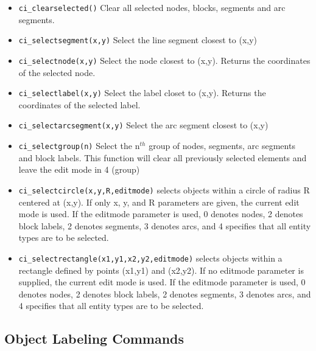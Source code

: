 \begin{itemize}
\item {\tt ci\_clearselected()} Clear all selected nodes, blocks, segments and arc
segments.

\item {\tt ci\_selectsegment(x,y)} Select the line segment closest to (x,y)

\item {\tt ci\_selectnode(x,y)} Select the node closest to (x,y).
Returns the coordinates of the selected node.

\item {\tt ci\_selectlabel(x,y)} Select the label closet to (x,y).
Returns the coordinates of the selected label.

\item {\tt ci\_selectarcsegment(x,y)} Select the arc segment closest to (x,y)

\item {\tt ci\_selectgroup(n)} Select the n$^{th}$ group of nodes, segments, arc
segments and block labels. This function will clear all previously selected
elements and leave the edit mode in 4 (group)

\item{\tt ci\_selectcircle(x,y,R,editmode)} selects objects within a circle of radius
R centered at (x,y).  If only x, y, and R parameters are given, the current
edit mode is used.  If the editmode parameter is used, 0 denotes nodes, 2
denotes block labels, 2 denotes segments, 3 denotes arcs, and 4 specifies
that all entity types are to be selected.

\item{\tt ci\_selectrectangle(x1,y1,x2,y2,editmode)} selects objects within a rectangle
defined by points (x1,y1) and (x2,y2). If no editmode parameter is supplied,
the current edit mode is used.  If the editmode parameter is used, 0 denotes
nodes, 2 denotes block labels, 2 denotes segments, 3 denotes arcs, and 4
specifies that all entity types are to be selected.

\end{itemize}


\subsection{Object Labeling Commands}

